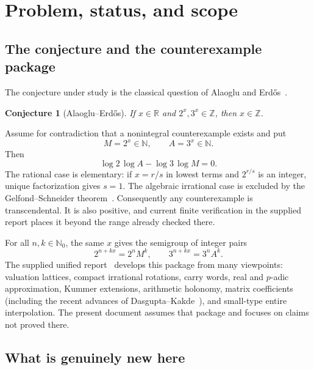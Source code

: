 \documentclass[11pt]{article}
\newtheorem{conjecture}[theorem]{Conjecture}
\theoremstyle{definition}
\theoremstyle{remark}
\newcommand{\N}{\mathbb N}
\newcommand{\Z}{\mathbb Z}
\newcommand{\R}{\mathbb R}
\begin{document}
\tableofcontents
\newpage

\section{Problem, status, and scope}

\subsection{The conjecture and the counterexample package}

The conjecture under study is the classical question of Alaoglu and Erd\H{o}s~\cite{AE1944}.
\begin{conjecture}[Alaoglu--Erd\H{o}s]
If $x\in\R$ and $2^x,3^x\in\Z$, then $x\in\Z$.
\end{conjecture}

Assume for contradiction that a nonintegral counterexample exists and put
\begin{equation}\label{eq:MA}
 M=2^x\in\N,\qquad A=3^x\in\N.
\end{equation}
Then
\begin{equation}\label{eq:detzero}
 \log 2\,\log A-\log 3\,\log M=0.
\end{equation}
The rational case is elementary: if $x=r/s$ in lowest terms and $2^{r/s}$ is an
integer, unique factorization gives $s=1$.  The algebraic irrational case is
excluded by the Gelfond--Schneider theorem~\cite{Baker1975}.  Consequently any counterexample is
transcendental.  It is also positive, and current finite verification in the
supplied report places it beyond the range already checked there.

For all $n,k\in\N_0$, the same $x$ gives the semigroup of integer pairs
\begin{equation}\label{eq:semigrouppairs}
 2^{n+kx}=2^nM^k,\qquad 3^{n+kx}=3^nA^k.
\end{equation}
The supplied unified report~\cite{Unified6} develops this package from many viewpoints: valuation lattices,
compact irrational rotations, carry words, real and $p$-adic approximation,
Kummer extensions, arithmetic holonomy, matrix coefficients (including the recent advances of Dasgupta--Kakde~\cite{DasguptaKakdeII}), and small-type
entire interpolation.  The present document assumes that package and focuses on
claims not proved there.

\subsection{What is genuinely new here}
\end{document}
